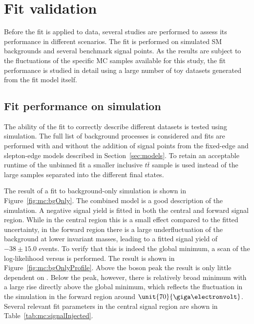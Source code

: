 \section{Fit validation}
Before the fit is applied to data, several studies are performed to assess its performance in different scenarios. The fit is performed on simulated SM backgrounds and several benchmark signal points. As the results are subject to the fluctuations of the specific MC samples available for this study, the fit performance is studied in detail using a large number of toy datasets generated from the fit model itself. 
\subsection{Fit performance on simulation}
The ability of the fit to correctly describe different datasets is tested using simulation. The full list of background processes is considered and fits are performed with and without the addition of signal points from the fixed-edge and slepton-edge models described in Section~\ref{sec:models}. To retain an acceptable runtime of the unbinned fit a smaller inclusive $t\bar{t}$ sample is used instead of the large samples separated into the different final states. 

The result of a fit to background-only simulation is shown in Figure~\ref{fig:mc:bgOnly}. The combined model is a good description of the simulation. A negative signal yield is fitted in both the central and forward signal region. While in the central region this is a small effect compared to the fitted uncertainty, in the forward region there is a large underfluctuation of the background at lower invariant masses, leading to a fitted signal yield of $-38\pm15.0$ events. To verify that this is indeed the global minimum, a scan of the log-likelihood versus \mlledge is performed. The result is shown in Figure~\ref{fig:mc:bgOnlyProfile}. Above the \Z boson peak the result is only little dependent on \mlledge. Below the peak, however, there is relatively broad minimum with a large rise directly above the global minimum, which reflects the fluctuation in the simulation in the forward region around $\unit{70}{\giga\electronvolt}$. Several relevant fit parameters in the central signal region are shown in Table~\ref{tab:mc:signalInjected}.

